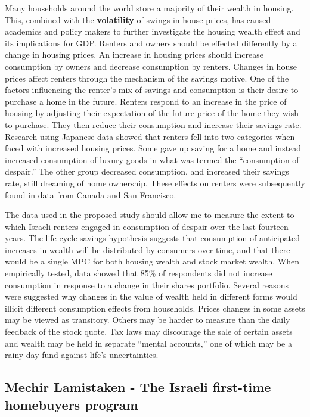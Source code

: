 \documentclass[12pt,a4paper,]{article}
\begin{document}
Many households around the world store a majority of their wealth in
housing. This, combined with the \textbf{volatility} of swings in house
prices, has caused academics and policy makers to further investigate
the housing wealth effect and its implications for
GDP.\autocite{Gan2010} Renters and owners should be effected differently
by a change in housing prices. An increase in housing prices should
increase consumption by owners and decrease consumption by renters.
Changes in house prices affect renters through the mechanism of the
savings motive. One of the factors influencing the renter's mix of
savings and consumption is their desire to purchase a home in the
future. Renters respond to an increase in the price of housing by
adjusting their expectation of the future price of the home they wish to
purchase. They then reduce their consumption and increase their savings
rate. Research using Japanese data showed that renters fell into two
categories when faced with increased housing prices. Some gave up saving
for a home and instead increased consumption of luxury goods in what was
termed the ``consumption of despair.'' The other group decreased
consumption, and increased their savings rate, still dreaming of home
ownership. These effects on renters were subsequently found in data from
Canada and San Francisco.\autocite{Sheiner1995}

The data used in the proposed study should allow me to measure the
extent to which Israeli renters engaged in consumption of despair over
the last fourteen years. The life cycle savings hypothesis suggests that
consumption of anticipated increases in wealth will be distributed by
consumers over time, and that there would be a single MPC for both
housing wealth and stock market wealth. When empirically tested, data
showed that 85\% of respondents did not increase consumption in response
to a change in their shares portfolio. Several reasons were suggested
why changes in the value of wealth held in different forms would illicit
different consumption effects from households. Prices changes in some
assets may be viewed as transitory. Others may be harder to measure than
the daily feedback of the stock quote. Tax laws may discourage the sale
of certain assets and wealth may be held in separate ``mental
accounts,'' one of which may be a rainy-day fund against life's
uncertainties.

\subsection{Mechir Lamistaken - The Israeli first-time homebuyers
program}\label{mechir-lamistaken---the-israeli-first-time-homebuyers-program}
\end{document}
